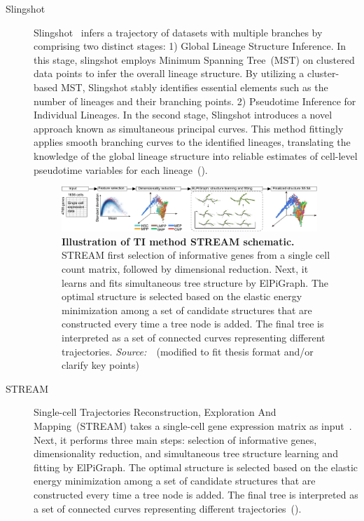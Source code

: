 \begin{description}
  \item[Slingshot]
  Slingshot~\citep{street2018slingshot} infers a trajectory of datasets with multiple branches by comprising two distinct stages: 1) Global Lineage Structure Inference. In this stage, slingshot employs Minimum Spanning Tree~(MST) on clustered data points to infer the overall lineage structure. By utilizing a cluster-based MST, Slingshot stably identifies essential elements such as the number of lineages and their branching points. 2) Pseudotime Inference for Individual Lineages. In the second stage, Slingshot introduces a novel approach known as simultaneous principal curves. This method fittingly applies smooth branching curves to the identified lineages, translating the knowledge of the global lineage structure into reliable estimates of cell-level pseudotime variables for each lineage~().

\begin{figure}[h!]
  	\centering
  	\includegraphics[width=0.95\textwidth]{TI_Alg_STREAM/fig}
  	\vspace{0.1cm}
  	\caption[Illustration of TI method STREAM schematic.]{\textbf{Illustration of TI method STREAM schematic.} STREAM first selection of informative genes from a single cell count matrix, followed by dimensional reduction. Next, it learns and fits simultaneous tree structure by ElPiGraph. The optimal structure is selected based on the elastic energy minimization among a set of candidate structures that are constructed every time a tree node is added. The final tree is interpreted as a set of connected curves representing different trajectories. \emph{Source:~\cite{chen2019stream}}~(modified to fit thesis format and/or clarify key points)
  	}
  	\label{fig:TI_Alg_STREAM}
\end{figure}

  \item[STREAM]
  Single-cell Trajectories Reconstruction, Exploration And Mapping~(STREAM) takes a single-cell gene expression matrix as input~\citep{chen2019stream}. Next, it performs three main steps: selection of informative genes, dimensionality reduction, and simultaneous tree structure learning and fitting by ElPiGraph. The optimal structure is selected based on the elastic energy minimization among a set of candidate structures that are constructed every time a tree node is added. The final tree is interpreted as a set of connected curves representing different trajectories~().


\end{description}
